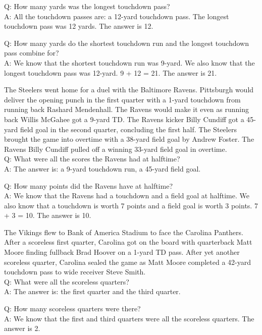 Q: How many yards was the longest touchdown pass? \\
A: All the touchdown passes are: a 12-yard touchdown pass. The longest touchdown pass was 12 yards. The answer is 12.

Q: How many yards do the shortest touchdown run and the longest touchdown pass combine for? \\
A: We know that the shortest touchdown run was 9-yard. We also know that the longest touchdown pass was 12-yard. 9 + 12 = 21. The answer is 21.

The Steelers went home for a duel with the Baltimore Ravens. Pittsburgh would deliver the opening punch in the first quarter with a 1-yard touchdown from running back Rashard Mendenhall. The Ravens would make it even as running back Willis McGahee got a 9-yard TD. The Ravens kicker Billy Cundiff got a 45-yard field goal in the second quarter, concluding the first half. The Steelers brought the game into overtime with a 38-yard field goal by Andrew Foster. The Ravens Billy Cundiff pulled off a winning 33-yard field goal in overtime. \\
Q: What were all the scores the Ravens had at halftime? \\
A: The answer is: a 9-yard touchdown run, a 45-yard field goal.

Q: How many points did the Ravens have at halftime? \\
A: We know that the Ravens had a touchdown and a field goal at halftime. We also know that a touchdown is worth 7 points and a field goal is worth 3 points. 7 + 3 = 10. The answer is 10.

The Vikings flew to Bank of America Stadium to face the Carolina Panthers. After a scoreless first quarter, Carolina got on the board with quarterback Matt Moore finding fullback Brad Hoover on a 1-yard TD pass. After yet another scoreless quarter, Carolina sealed the game as Matt Moore completed a 42-yard touchdown pass to wide receiver Steve Smith. \\
Q: What were all the scoreless quarters? \\
A: The answer is: the first quarter and the third quarter.

Q: How many scoreless quarters were there? \\
A: We know that the first and third quarters were all the scoreless quarters. The answer is 2.



